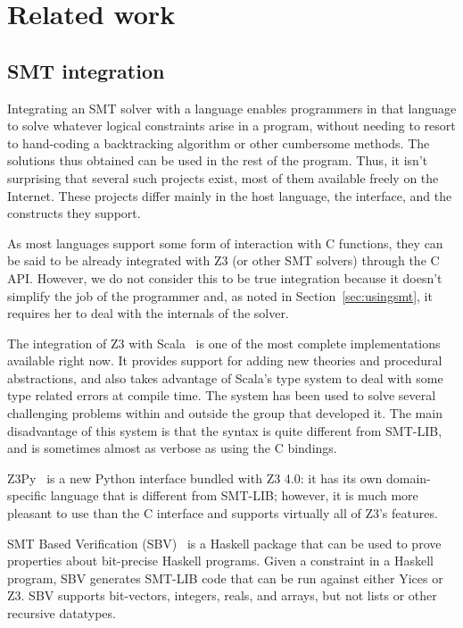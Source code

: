 \chapter{Related work}

\section{SMT integration}

Integrating an SMT solver with a language enables programmers in that language
to solve whatever logical constraints arise in a program, without needing to
resort to hand-coding a backtracking algorithm or other cumbersome methods.
The solutions thus obtained can be used in the rest of the program. Thus, it
isn't surprising that several such projects exist, most of them available
freely on the Internet. These projects differ mainly in the host language, the
interface, and the constructs they support.

As most languages support some form of interaction with C functions, they can
be said to be already integrated with Z3 (or other SMT solvers) through the C
API. However, we do not consider this to be true integration because it
doesn't simplify the job of the programmer and, as noted in
Section~\ref{sec:usingsmt}, it requires her to deal with the internals of the
solver.

The integration of Z3 with Scala~\cite{scalaz3} is one of the most complete
implementations available right now. It provides support for adding new
theories and procedural abstractions, and also takes advantage of Scala's type
system to deal with some type related errors at compile time.  The system has
been used to solve several challenging problems within and outside the group
that developed it. The main disadvantage of this system is that the syntax is
quite different from SMT-LIB, and is sometimes almost as verbose as using the
C bindings.

Z3Py~\cite{z3py} is a new Python interface bundled with Z3 4.0: it has its own
domain-specific language that is different from SMT-LIB; however, it is
much more pleasant to use than the C interface and supports virtually all of
Z3's features.

SMT Based Verification (SBV)~\cite{sbv} is a Haskell package that can be used
to prove properties about bit-precise Haskell programs. Given a constraint in
a Haskell program, SBV generates SMT-LIB code that can be run against either
Yices or Z3. SBV supports bit-vectors, integers, reals, and arrays, but not
lists or other recursive datatypes.


